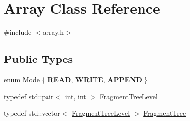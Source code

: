 \hypertarget{classArray}{}\section{Array Class Reference}
\label{classArray}


{\ttfamily \#include $<$array.\+h$>$}

\subsection*{Public Types}
\begin{DoxyCompactItemize}
\item 
enum \hyperlink{classArray_af5ea7849b92677a1f529cdb76b501920}{Mode} \{ {\bfseries R\+E\+A\+D}, 
{\bfseries W\+R\+I\+T\+E}, 
{\bfseries A\+P\+P\+E\+N\+D}
 \}
\item 
typedef std\+::pair$<$ int, int $>$ \hyperlink{classArray_a4ee28ba68259060587f520d625065c19}{Fragment\+Tree\+Level}
\item 
typedef std\+::vector$<$ \hyperlink{classArray_a4ee28ba68259060587f520d625065c19}{Fragment\+Tree\+Level} $>$ \hyperlink{classArray_a7bbd1306e58f5cb6f6e633c121df05b8}{Fragment\+Tree}
\end{DoxyCompactItemize}
